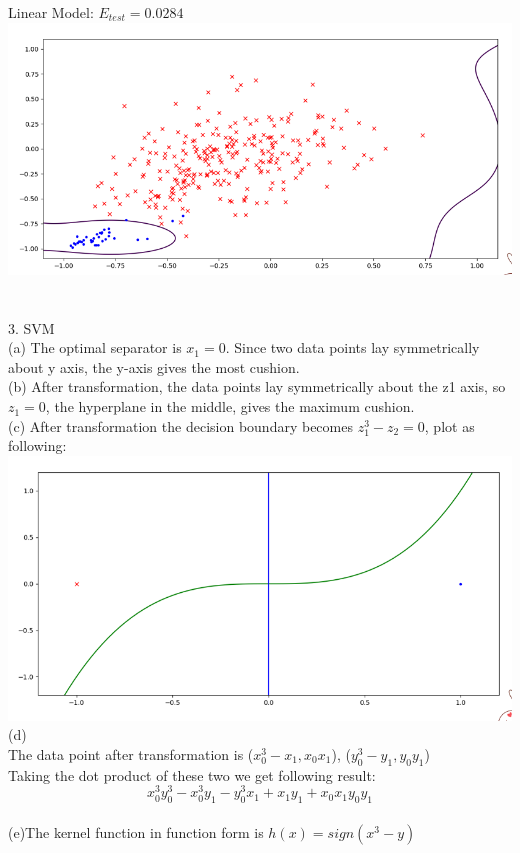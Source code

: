 \documentclass[12pt]{article}
\begin{document}
Linear Model: $E_{test} = 0.0284$\\
\includegraphics[scale=0.6]{images/linear_model}\\\\\\
3. SVM\\
(a) The optimal separator is $x_1=0$. Since two data points lay symmetrically about y axis, the y-axis gives the most cushion.\\
(b) After transformation, the data points lay symmetrically about the z1 axis, so $z_1=0$, the hyperplane
in the middle, gives the maximum cushion.\\
(c) After transformation the decision boundary becomes $z_1^3-z_2=0$, plot as following:\\
\includegraphics[scale=0.6]{images/svm_p3}\\
(d)\\
The data point after transformation is ($x_0^3-x_1, x_0x_1$), ($y_0^3-y_1, y_0y_1$)\\
Taking the dot product of these two we get following result:\\
$$x_0^3y_0^3-x_0^3y_1-y_0^3x_1+x_1y_1+x_0x_1y_0y_1$$\\
(e)The kernel function in function form is $h(x)=sign(x^3-y)$\\\\
\end{document}
